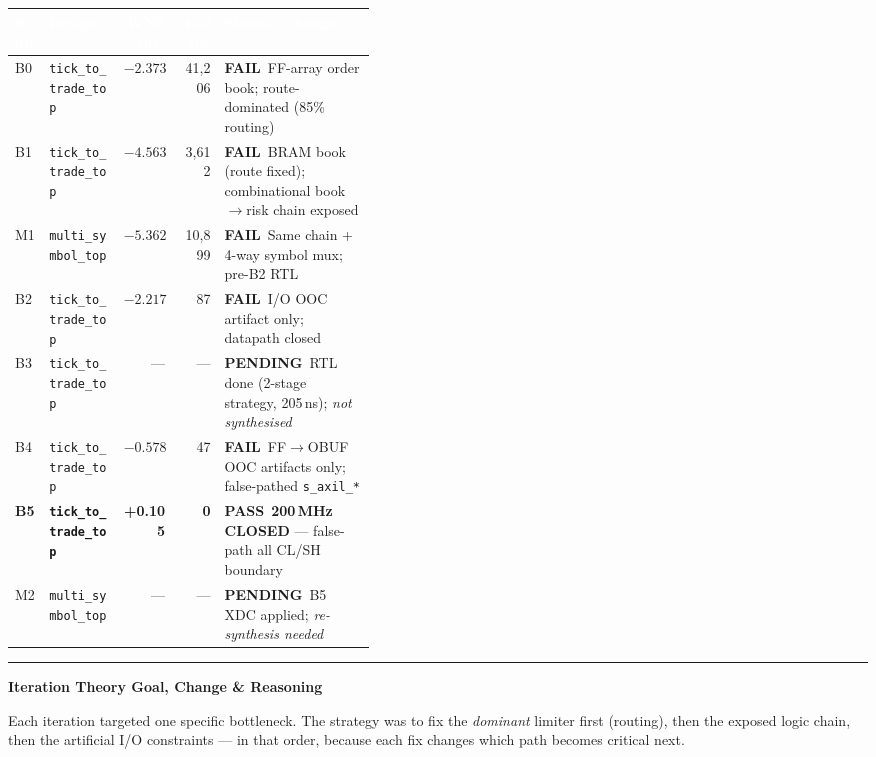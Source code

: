 \documentclass[10pt,a4paper]{article}
\newcommand{\fail}{\textcolor{badred}{\textbf{FAIL}}}
\newcommand{\pass}{\textcolor{okgreen}{\textbf{PASS}}}
\newcommand{\pending}{\textcolor{warnamber}{\textbf{PENDING}}}
\newcommand{\NEW}[1]{\colorbox{newbg}{\textcolor{newtext}{\textbf{#1}}}}
\newcommand{\sectionrule}{\vspace{2pt}\textcolor{rulegray}{\rule{\linewidth}{0.8pt}}\vspace{2pt}}
\begin{document}
\vspace{4pt}
\begin{center}
\renewcommand{\arraystretch}{1.35}
\begin{tabular}{@{}l l r r p{0.42\linewidth}@{}}
\toprule
\rowcolor{hdrblue}
\textcolor{white}{\textbf{Run}} &
\textcolor{white}{\textbf{Design}} &
\textcolor{white}{\textbf{WNS (ns)}} &
\textcolor{white}{\textbf{Fail eps}} &
\textcolor{white}{\textbf{Status / change}} \\
\midrule
\rowcolor{failrowbg}
B0 & \texttt{tick\_to\_trade\_top} & $-2.373$ & 41{,}206 &
  \fail\ FF-array order book; route-dominated (85\% routing) \\
\rowcolor{failrowbg}
B1 & \texttt{tick\_to\_trade\_top} & $-4.563$ & 3{,}612 &
  \fail\ BRAM book (route fixed); combinational book$\to$risk chain exposed \\
\rowcolor{failrowbg}
M1 & \texttt{multi\_symbol\_top}  & $-5.362$ & 10{,}899 &
  \fail\ Same chain + 4-way symbol mux; pre-B2 RTL \\
\rowcolor{failrowbg}
B2 & \texttt{tick\_to\_trade\_top} & $-2.217$ & 87 &
  \fail\ I/O OOC artifact only; \textcolor{okgreen}{datapath closed} \\
\rowcolor{pendrowbg}
B3 & \texttt{tick\_to\_trade\_top} & --- & --- &
  \pending\ RTL done (2-stage strategy, 205\,ns); \textit{not synthesised} \\
\rowcolor{failrowbg}
B4 & \texttt{tick\_to\_trade\_top} & $-0.578$ & 47 &
  \fail\ FF$\to$OBUF OOC artifacts only; false-pathed \texttt{s\_axil\_*} \\
\rowcolor{passrowbg}
\NEW{B5} & \NEW{\texttt{tick\_to\_trade\_top}} &
  \textcolor{okgreen}{\textbf{+0.105}} &
  \textcolor{okgreen}{\textbf{0}} &
  \pass\ \textbf{200\,MHz CLOSED} — false-path all CL/SH boundary \\
\rowcolor{pendrowbg}
M2 & \texttt{multi\_symbol\_top} & --- & --- &
  \pending\ B5 XDC applied; \textit{re-synthesis needed} \\
\bottomrule
\end{tabular}
\end{center}

\sectionrule

{\large\bfseries\color{hdrblue} Iteration Theory \textendash{} Goal, Change \& Reasoning}

\vspace{2pt}
Each iteration targeted one specific bottleneck. The strategy was to fix the
\emph{dominant} limiter first (routing), then the exposed logic chain, then the
artificial I/O constraints — in that order, because each fix changes which path
becomes critical next.
\end{document}
